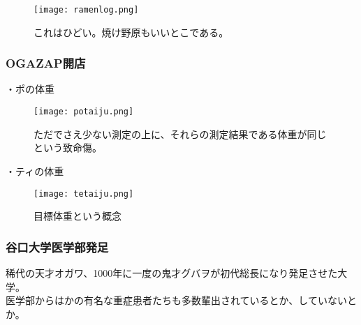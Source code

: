 \begin{figure}[H]
  \centering
  \texttt{[image: ramenlog.png]}
  \caption{これはひどい。焼け野原もいいとこである。}
\label{ramenlog}
\end{figure}



\subsubsection{OGAZAP開店}
・ポの体重\\
\begin{figure}[H]
  \centering
  \texttt{[image: potaiju.png]}
  \caption{ただでさえ少ない測定の上に、それらの測定結果である体重が同じという致命傷。}
\label{potaiju}
\end{figure}

・ティの体重\\
\begin{figure}[H]
  \centering
  \texttt{[image: tetaiju.png]}
  \caption{目標体重という概念}
\label{tetaiju}
\end{figure}


\subsubsection{谷口大学医学部発足}
稀代の天才オガワ、1000年に一度の鬼才グバヲが初代総長になり発足させた大学。 \\
医学部からはかの有名な重症患者たちも多数輩出されているとか、していないとか。\\


